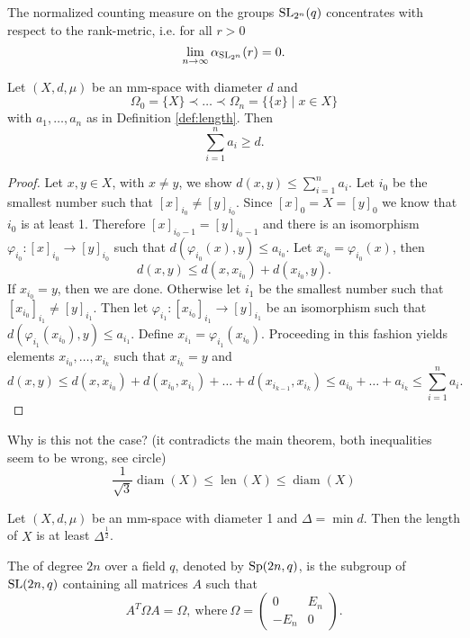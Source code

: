 \begin{theorem}
The normalized counting measure on the groups $\operatorname{SL}_{2^n}(q)$ concentrates with respect to the rank-metric, i.e. for all $r>0$
\[\lim_{n\to\infty} \alpha_{\operatorname{SL}_{2^n}}(r)=0 .\]
\end{theorem}

\begin{lemma}
Let $(X,d,\mu)$ be an mm-space with diameter $d$ and 
\[\Omega_0=\{X\}\prec\dots\prec\Omega_n=\{\{x\}\mid x\in X\}\]
with $a_1,\dots,a_n$ as in Definition \ref{def:length}. Then 
\[\sum_{i=1}^{n}a_i\geq d.\]
\end{lemma}
\begin{proof}
Let $x,y\in X$, with $x\neq y$, we show $d(x,y)\leq\sum_{i=1}^{n}a_i$. Let $i_0$ be the smallest number such that $[x]_{i_0}\neq [y]_{i_0}$. Since $[x]_0=X=[y]_0$ we know that $i_0$ is at least 1. Therefore $[x]_{i_0-1}=[y]_{i_0-1}$ and there is an isomorphism $\varphi_{i_0}\colon[x]_{i_0}\to[y]_{i_0}$ such that $d(\varphi_{i_0}(x),y)\leq a_{i_0}$. Let $x_{i_0}=\varphi_{i_0}(x)$, then 
\[d(x,y)\leq d(x,x_{i_0})+d(x_{i_0},y).\]
If $x_{i_0}=y$, then we are done. Otherwise let $i_1$ be the smallest number such that $[x_{i_0}]_{i_1}\neq [y]_{i_1}$. Then let $\varphi_{i_1}\colon[x_{i_0}]_{i_1}\to[y]_{i_1}$ be an isomorphism such that $d(\varphi_{i_1}(x_{i_0}),y)\leq a_{i_1}$. Define $x_{i_1}=\varphi_{i_1}(x_{i_0})$. Proceeding in this fashion yields elements $x_{i_0},\dots,x_{i_k}$ such that $x_{i_k}=y$ and
\[d(x,y)\leq d(x,x_{i_0})+d(x_{i_0},x_{i_1})+\dots+d(x_{i_{k-1}},x_{i_k})\leq a_{i_0}+\dots +a_{i_k}\leq\sum_{i=1}^{n}a_i.\] 
\end{proof}


\begin{lemma}Why is this not the case? (it contradicts the main theorem, both inequalities seem to be wrong, see circle)
\[\frac{1}{\sqrt{3}}\operatorname{diam}(X)\leq\operatorname{len}(X)\leq \operatorname{diam}(X)\]
\end{lemma}

\begin{lemma}
Let $(X,d,\mu)$ be an mm-space with diameter 1 and $\Delta=\min d$. Then the length of $X$ is at least $\Delta^{\frac{1}{2}}$.
\end{lemma}

\begin{definition}
The  of degree $2n$ over a field $q$, denoted by $\operatorname{Sp}(2n,q)$, is the subgroup of $\operatorname{SL}(2n,q)$ containing all matrices $A$ such that
\[A^T\Omega A=\Omega,\ \text{where}\ \Omega=\left(\begin{array}{cc}
0&E_n\\
-E_n&0
\end{array}\right).\]
\end{definition}

